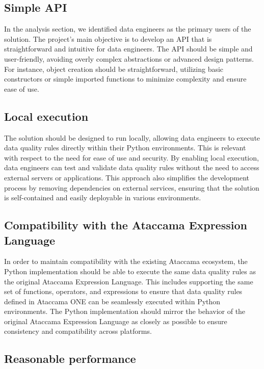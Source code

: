 \subsection{Simple API}

In the analysis section, we identified data engineers as the primary users of the solution. The project's main objective is to develop an API that is straightforward and intuitive for data engineers. The API should be simple and user-friendly, avoiding overly complex abstractions or advanced design patterns. For instance, object creation should be straightforward, utilizing basic constructors or simple imported functions to minimize complexity and ensure ease of use.

\subsection{Local execution}

The solution should be designed to run locally, allowing data engineers to execute data quality rules directly within their Python environments. This is relevant with respect to the need for ease of use and security. By enabling local execution, data engineers can test and validate data quality rules without the need to access external servers or applications. This approach also simplifies the development process by removing dependencies on external services, ensuring that the solution is self-contained and easily deployable in various environments.

\subsection{Compatibility with the Ataccama Expression Language}

In order to maintain compatibility with the existing Ataccama ecosystem, the Python implementation should be able to execute the same data quality rules as the original Ataccama Expression Language. This includes supporting the same set of functions, operators, and expressions to ensure that data quality rules defined in Ataccama ONE can be seamlessly executed within Python environments. The Python implementation should mirror the behavior of the original Ataccama Expression Language as closely as possible to ensure consistency and compatibility across platforms.

\subsection{Reasonable performance}

